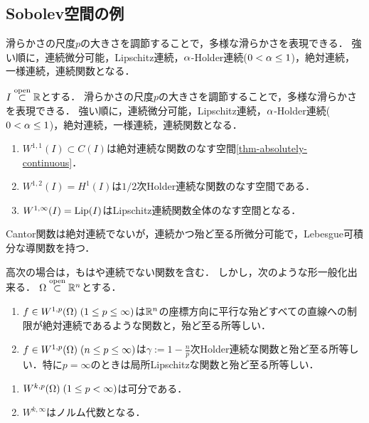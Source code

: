 \documentclass[uplatex,dvipdfmx]{jsreport}
\begin{document}
\subsection{Sobolev空間の例}

\begin{tcolorbox}[colframe=ForestGreen, colback=ForestGreen!10!white,breakable,colbacktitle=ForestGreen!40!white,coltitle=black,fonttitle=\bfseries\sffamily,
title=]
    滑らかさの尺度$p$の大きさを調節することで，多様な滑らかさを表現できる．
    強い順に，連続微分可能，Lipschitz連続，$\alpha$-Holder連続($0<\alpha\le 1$)，絶対連続，一様連続，連続関数となる．
\end{tcolorbox}

\begin{example}[一次元の場合]
    $I\overset{\mathrm{open}}{\subset}\mathbb{R}$とする．
    滑らかさの尺度$p$の大きさを調節することで，多様な滑らかさを表現できる．
    強い順に，連続微分可能，Lipschitz連続，$\alpha$-Holder連続($0<\alpha\le 1$)，絶対連続，一様連続，連続関数となる．
    \begin{enumerate}
        \item $W^{1,1}(I)\subset C(I)$は絶対連続な関数のなす空間\ref{thm-absolutely-continuous}．
        \item $W^{1,2}(I)=H^1(I)$は$1/2$次Holder連続な関数のなす空間である．
        \item $W^{1,\infty}(I)=\mathrm{Lip}(I)$はLipschitz連続関数全体のなす空間となる．
    \end{enumerate}
    Cantor関数は絶対連続でないが，連続かつ殆ど至る所微分可能で，Lebesgue可積分な導関数を持つ．
\end{example}

\begin{proposition}
    高次の場合は，もはや連続でない関数を含む．
    しかし，次のような形一般化出来る．
    $\Omega\overset{\mathrm{open}}{\subset}\mathbb{R}^n$とする．
    \begin{enumerate}
        \item $f\in W^{1,p}(\Omega)\;(1\le p\le\infty)$は$\mathbb{R}^n$の座標方向に平行な殆どすべての直線への制限が絶対連続であるような関数と，殆ど至る所等しい．
        \item $f\in W^{1,p}(\Omega)\;(n\le p\le\infty)$は$\gamma:=1-\frac{n}{p}$次Holder連続な関数と殆ど至る所等しい．特に$p=\infty$のときは局所Lipschitzな関数と殆ど至る所等しい．
    \end{enumerate}
\end{proposition}

\begin{proposition}\mbox{}
    \begin{enumerate}
        \item $W^{k,p}(\Omega)\;(1\le p<\infty)$は可分である．
        \item $W^{k,\infty}$はノルム代数となる．
    \end{enumerate}
\end{proposition}
\end{document}
